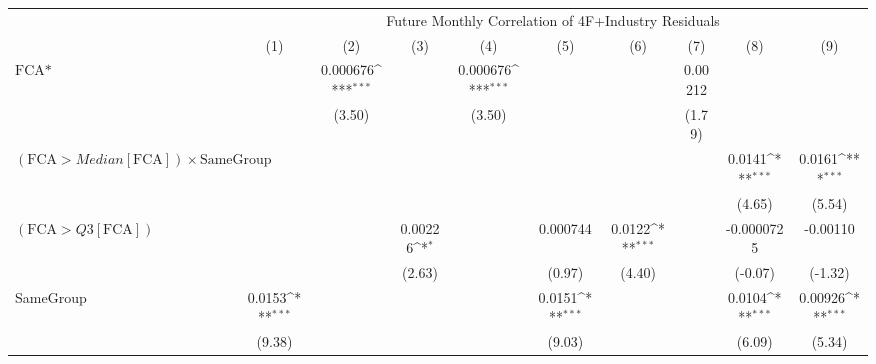 {
\def\sym#1{\ifmmode^{#1}\else\(^{#1}\)\fi}
\begin{tabular}{l*{9}{c}}
\hline\hline
                &\multicolumn{9}{c}{Future Monthly Correlation of 4F+Industry Residuals}                                                                                                   \\\cmidrule(lr){2-10}
                &\multicolumn{1}{c}{(1)}         &\multicolumn{1}{c}{(2)}         &\multicolumn{1}{c}{(3)}         &\multicolumn{1}{c}{(4)}         &\multicolumn{1}{c}{(5)}         &\multicolumn{1}{c}{(6)}         &\multicolumn{1}{c}{(7)}         &\multicolumn{1}{c}{(8)}         &\multicolumn{1}{c}{(9)}         \\
\hline
$ \text{FCA*} $ &                  & 0.000676\sym{***}&                  & 0.000676\sym{***}&                  &                  &  0.00212         &                  &                  \\
                &                  &   (3.50)         &                  &   (3.50)         &                  &                  &   (1.79)         &                  &                  \\
[1em]
 $ (\text{FCA} > Median[\text{FCA}]) \times  {\text{SameGroup} }  $ &                  &                  &                  &                  &                  &                  &                  &   0.0141\sym{***}&   0.0161\sym{***}\\
                &                  &                  &                  &                  &                  &                  &                  &   (4.65)         &   (5.54)         \\
[1em]
 $ (\text{FCA} > Q3[\text{FCA}]) $ &                  &                  &  0.00226\sym{*}  &                  & 0.000744         &   0.0122\sym{***}&                  &-0.0000725         & -0.00110         \\
                &                  &                  &   (2.63)         &                  &   (0.97)         &   (4.40)         &                  &  (-0.07)         &  (-1.32)         \\
[1em]
SameGroup       &   0.0153\sym{***}&                  &                  &                  &   0.0151\sym{***}&                  &                  &   0.0104\sym{***}&  0.00926\sym{***}\\
                &   (9.38)         &                  &                  &                  &   (9.03)         &                  &                  &   (6.09)         &   (5.34)         \\

\end{tabular}}
